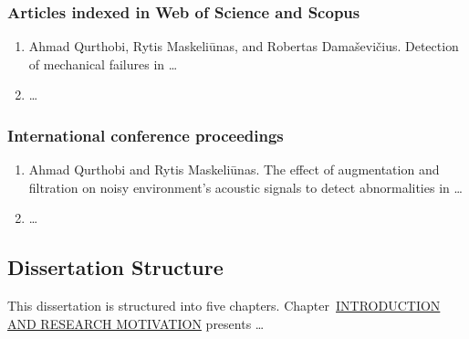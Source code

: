 \subsubsection*{Articles indexed in Web of Science and Scopus}
\begin{enumerate}[leftmargin=*]
	\item Ahmad Qurthobi, Rytis Maskeli\={u}nas, and Robertas Dama\v{s}evi\v{c}ius. Detection of mechanical failures in \dots
	\item \dots
\end{enumerate}
\subsubsection*{International conference proceedings}
\begin{enumerate}[leftmargin=*]
	\item Ahmad Qurthobi and Rytis Maskeli\={u}nas. The effect of augmentation and filtration on noisy environment’s acoustic signals to detect abnormalities in \dots
	\item \dots
\end{enumerate}

\subsection*{Dissertation Structure}\label{sec:dis_struc}
This dissertation is structured into five chapters. Chapter~\hyperref[chap:intro]{\MakeUppercase{Introduction and Research Motivation}} presents \dots
